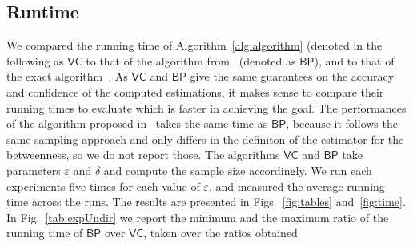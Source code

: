 \subsection{Runtime}\label{sec:runtime}
We compared the running time of Algorithm~\ref{alg:algorithm} (denoted in the
following as $\mathsf{VC}$ to that of the algorithm
from~\citep{JacobKLPT05,BrandesP07,GeisbergerSS08}
(denoted as $\mathsf{BP}$), and to that of the exact
algorithm~\citep{Brandes01}. As $\mathsf{VC}$ and $\mathsf{BP}$ give the same
guarantees on the accuracy and confidence of the computed estimations, it makes
sense to compare their running times to evaluate which is faster in achieving
the goal. The performances of the algorithm proposed in~\citep{GeisbergerSS08}
takes the same time as $\mathsf{BP}$, because it follows the same sampling
approach and only differs in the definiton of the estimator for the betweenness,
so we do not report those.
The algorithms $\mathsf{VC}$ and $\mathsf{BP}$ take parameters $\varepsilon$ and
$\delta$ and compute the sample size accordingly. 
 We run each experiments five times for each value of $\varepsilon$, and
measured the average running time across the runs.
The results are presented in Figs.~\ref{fig:tables} 
and~\ref{fig:time}. 
%
In Fig.~\ref{tab:expUndir} we report the minimum and the maximum ratio of the
running time of $\mathsf{BP}$ over $\mathsf{VC}$, taken over the ratios obtained
